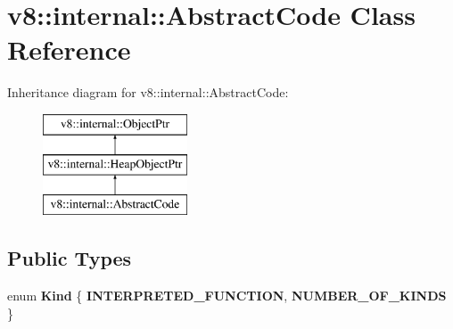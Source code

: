 \hypertarget{classv8_1_1internal_1_1AbstractCode}{}\section{v8\+:\+:internal\+:\+:Abstract\+Code Class Reference}
\label{classv8_1_1internal_1_1AbstractCode}
Inheritance diagram for v8\+:\+:internal\+:\+:Abstract\+Code\+:\begin{figure}[H]
\begin{center}
\leavevmode
\includegraphics[height=3.000000cm]{classv8_1_1internal_1_1AbstractCode}
\end{center}
\end{figure}
\subsection*{Public Types}
\begin{DoxyCompactItemize}
\item 
\mbox{\label{classv8_1_1internal_1_1AbstractCode_a915d9a221d696e00492c45273de7d7c0}} 
enum {\bfseries Kind} \{ {\bfseries I\+N\+T\+E\+R\+P\+R\+E\+T\+E\+D\+\_\+\+F\+U\+N\+C\+T\+I\+ON}, 
{\bfseries N\+U\+M\+B\+E\+R\+\_\+\+O\+F\+\_\+\+K\+I\+N\+DS}
 \}
\end{DoxyCompactItemize}

